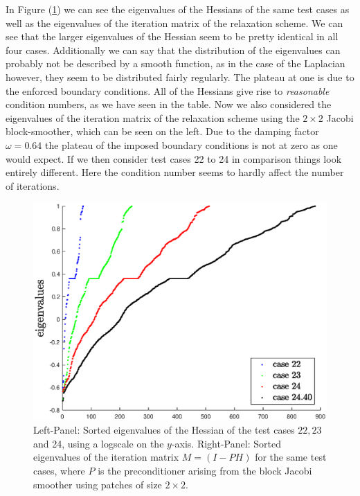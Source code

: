 \documentclass[../draft_1.tex]{subfiles}
\begin{document}
In Figure (\ref{fig:eigenvalues_H_and_it_mat}) we can see the eigenvalues of the Hessians of the same test cases as well as the eigenvalues of the iteration matrix of the relaxation scheme. We can see that the larger eigenvalues of the Hessian seem to be pretty identical in all four cases. Additionally we can say that the distribution of the eigenvalues can probably not be described by a smooth function, as in the case of the Laplacian however, they seem to be distributed fairly regularly. The plateau at one is due to the enforced boundary conditions. All of the Hessians give rise to \textit{reasonable} condition numbers, as we have seen in the table. Now we also considered the eigenvalues of the iteration matrix of the relaxation scheme using the $2 \times 2$ Jacobi block-smoother, which can be seen on the left. Due to the damping factor $\omega = 0.64$ the plateau of the imposed boundary conditions is not at zero as one would expect. If we then consider test cases 22 to 24 in comparison things look entirely different. Here the condition number seems to hardly affect the number of iterations. 
\begin{figure}
	\includegraphics[scale=0.4]{images/implementation/eigenvalues/plot_eigenvalues_iter_mat_block_Jac_tc_c2_100}
	\caption{Left-Panel: Sorted eigenvalues of the Hessian of the test cases $22, 23$ and 24, using a logscale on the $y$-axis. Right-Panel: Sorted eigenvalues of the iteration matrix $M = (I - PH)$ for the same test cases, where $P$ is the preconditioner arising from the block Jacobi smoother using patches of size $2 \times 2$.}
	\label{fig:eigenvalues_H_and_it_mat}
\end{figure}
\end{document}
